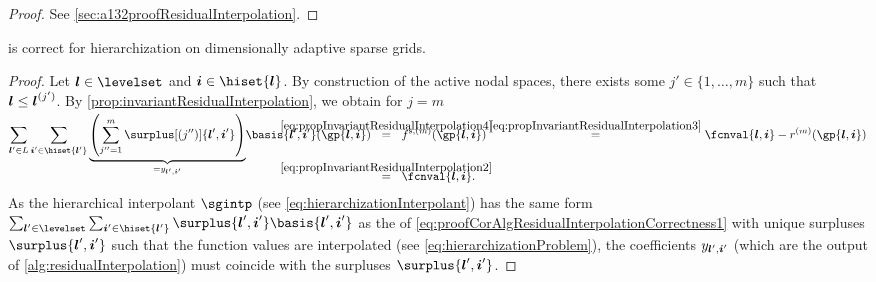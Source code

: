 \begin{proof}
  See \cref{sec:a132proofResidualInterpolation}.
\end{proof}

\begin{corollary}
  \label{cor:algResidualInterpolationCorrectness}
   is correct for hierarchization
  on dimensionally adaptive sparse grids.
\end{corollary}

\begin{proof}
  Let $\*l \in \levelset$ and $\*i \in \hiset{\*l}$.
  By construction of the active nodal spaces,
  there exists some $j' \in \{1, \dotsc, m\}$ such that ${\boldsymbol{l}} \le {\boldsymbol{l}}^{(j')}$.
  By \cref{prop:invariantResidualInterpolation}, we obtain
  for $j = m$
  \begin{subequations}
    \label{eq:proofCorAlgResidualInterpolationCorrectness1}
    \begin{align}
      \sum_{\*l' \in L} \sum_{\*i' \in \hiset{\*l'}}
      \smash{
        \underbrace{
          \paren*{\sum_{j''=1}^{m} \surplus[(j'')]{\*l',\*i'}}
        }_{= \linout{\*l',\*i'}}
      }
      \basis{\*l',\*i'}(\gp{\*l,\*i})
      &\quad\;
      \mathclap{\overset{\eqref{eq:propInvariantResidualInterpolation4}}{=}}
      \quad\;
      f^{\sparse,(m)}(\gp{\*l,\*i})
      \overset{\eqref{eq:propInvariantResidualInterpolation3}}{=}
      \fcnval{\*l,\*i} - r^{(m)}(\gp{\*l,\*i})\\
      &\quad\;
      \mathclap{\overset{\eqref{eq:propInvariantResidualInterpolation2}}{=}}
      \quad\;
      \fcnval{\*l,\*i}.
    \end{align}
  \end{subequations}
  As the hierarchical interpolant $\sgintp$
  (see \eqref{eq:hierarchizationInterpolant})
  has the same form
  $\sum_{\*l' \in \levelset} \sum_{\*i' \in \hiset{\*l'}}
  \surplus{\*l',\*i'} \basis{\*l',\*i'}$ as the \lhs of
  \eqref{eq:proofCorAlgResidualInterpolationCorrectness1}
  with unique surpluses $\surplus{\*l',\*i'}$ such that the function values
  are interpolated (see \eqref{eq:hierarchizationProblem}),
  the coefficients $\linout{\*l',\*i'}$
  (which are the output of \cref{alg:residualInterpolation})
  must coincide with the surpluses $\surplus{\*l',\*i'}$.
\end{proof}

